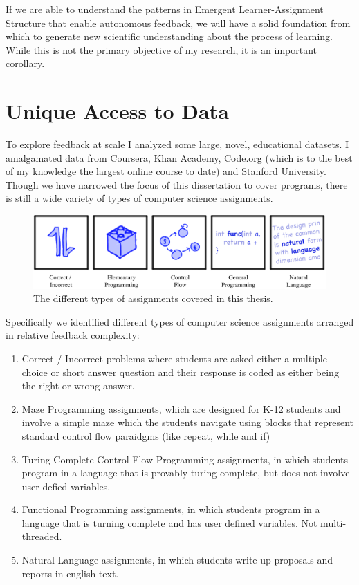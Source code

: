 If we are able to understand the patterns in Emergent Learner-Assignment Structure that enable autonomous feedback, we will have a solid foundation from which to generate new scientific understanding about the process of learning. While this is not the primary objective of my research, it is an important corollary.


\section{Unique Access to Data}

To explore feedback at scale I analyzed some large, novel, educational
datasets. I amalgamated data from Coursera, Khan Academy, Code.org (which is to the
best of my knowledge the largest online course to date) and Stanford University. Though we have narrowed the focus of this dissertation to cover programs, there is still a wide variety of types of computer science assignments. 

\begin{figure}[h]
\center
\includegraphics[width=1.0\textwidth]{img/assnType_all}
\caption[Assignment types]{
The different types of assignments covered in this thesis.
\label{fig:assnTypes}
}
\end{figure}

Specifically we identified different types of computer science assignments arranged in relative feedback complexity: 
\begin{enumerate}
\item Correct / Incorrect problems where students are asked either a multiple choice or short answer question and their response is coded as either being the right or wrong answer. 
\item Maze Programming assignments, which are designed for K-12 students and involve a simple maze which the students navigate using blocks that represent standard control flow paraidgms (like repeat, while and if)
\item Turing Complete Control Flow Programming assignments, in which students program in a language that is provably turing complete, but does not involve user defied variables.
\item Functional Programming assignments, in which students program in a language that is turning complete and has user defined variables. Not multi-threaded.
\item Natural Language assignments, in which students write up proposals and reports in english text.	
\end{enumerate}

